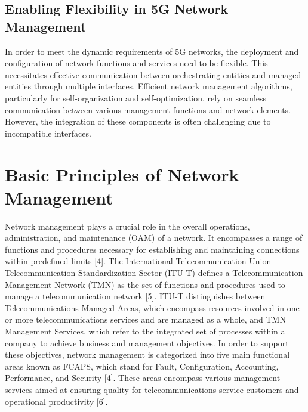 \subsection{Enabling Flexibility in 5G Network Management}
In order to meet the dynamic requirements of 5G networks, the deployment and configuration of network functions and services need to be flexible. This necessitates effective communication between orchestrating entities and managed entities through multiple interfaces. Efficient network management algorithms, particularly for self-organization and self-optimization, rely on seamless communication between various management functions and network elements. However, the integration of these components is often challenging due to incompatible interfaces. \\
\section{Basic Principles of Network Management}
Network management plays a crucial role in the overall operations, administration, and maintenance (OAM) of a network. It encompasses a range of functions and procedures necessary for establishing and maintaining connections within predefined limits \cite{bibid}[4]. The International Telecommunication Union - Telecommunication Standardization Sector (ITU-T) defines a Telecommunication Management Network (TMN) as the set of functions and procedures used to manage a telecommunication network \cite{bibid}[5].
ITU-T distinguishes between Telecommunications Managed Areas, which encompass resources involved in one or more telecommunications services and are managed as a whole, and TMN Management Services, which refer to the integrated set of processes within a company to achieve business and management objectives.
In order to support these objectives, network management is categorized into five main functional areas known as FCAPS, which stand for Fault, Configuration, Accounting, Performance, and Security \cite{bibid}[4]. These areas encompass various management services aimed at ensuring quality for telecommunications service customers and operational productivity \cite{bibid}[6].
